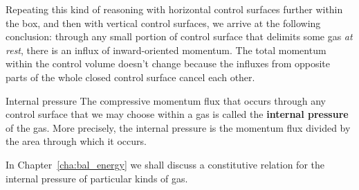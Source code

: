 \documentclass[a4paper,12pt,%
onecolumn,oneside,%
british%
]{memoir}
\renewcommand*{\|}[1][]{\nonscript\:#1\vert\nonscript\:\mathopen{}}
\newcommand*{\chap}{Chapter}%
\begin{document}
Repeating this kind of reasoning with horizontal control surfaces further within the box, and then with vertical control surfaces, we arrive at the following conclusion: through any small portion of control surface that delimits some gas \emph{at rest}, there is an influx of inward-oriented momentum. The total momentum within the control volume doesn't change because the influxes from opposite parts of the whole closed control surface cancel each other.
%
\begin{definition}{Internal pressure}\label{def:internal_pressure}
  The compressive momentum flux that occurs through any control surface that we may choose within a gas is called the \textbf{internal pressure} of the gas. More precisely, the internal pressure is the momentum flux divided by the area through which it occurs.
\end{definition}
In \chap~\ref{cha:bal_energy} we shall discuss a constitutive relation for the internal pressure of particular kinds of gas.
\end{document}
